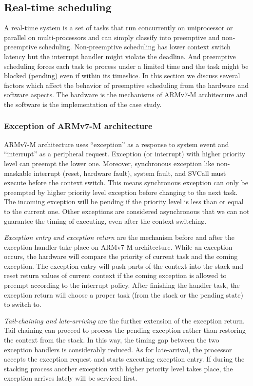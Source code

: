 \subsection{Real-time scheduling}
A real-time system is a set of tasks that run concurrently on uniprocessor or parallel on multi-processors and can simply classify into preemptive and non-preemptive scheduling. Non-preemptive scheduling has lower context switch latency but the interrupt handler might violate the deadline. And preemptive scheduling forces each task to process under a limited time and the task might be blocked (pending) even if within its timeslice. In this section we discuss several factors which affect the behavior of preemptive scheduling from the hardware and software aspects. The hardware is the mechanisms of ARMv7-M architecture and the software is the implementation of the case study.

\subsubsection{Exception of ARMv7-M architecture}
ARMv7-M architecture \cite{ARMv7-M:Manual, Yiu:2013:DGA:2602039} uses ``exception'' as a response to system event and ``interrupt'' as a peripheral request. Exception (or interrupt) with higher priority level can preempt the lower one. Moreover, synchronous exception like non-maskable interrupt (reset, hardware fault), system fault, and SVCall must execute before the context switch. This means synchronous exception can only be preempted by higher priority level exception before changing to the next task. The incoming exception will be pending if the priority level is less than or equal to the current one. Other exceptions are considered asynchronous that we can not guarantee the timing of executing, even after the context switching.

\textit{Exception entry and exception return} are the mechanism before and after the exception handler take place on ARMv7-M architecture. While an exception occurs, the hardware will compare the priority of current task and the coming exception. The exception entry will push parts of the context into the stack and reset return values of current context if the coming exception is allowed to preempt according to the interrupt policy. After finishing the handler task, the exception return will choose a proper task (from the stack or the pending state) to switch to.

\textit{Tail-chaining and late-arriving} are the further extension of the exception return. Tail-chaining can proceed to process the pending exception rather than restoring the context from the stack. In this way, the timing gap between the two exception handlers is considerably reduced. As for late-arrival, the processor accepts the exception request and starts executing exception entry. If during the stacking process another exception with higher priority level takes place, the exception arrives lately will be serviced first.

